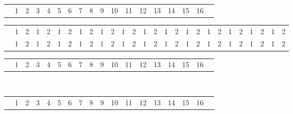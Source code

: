 \documentclass[22pt]{scrartcl}
\begin{document}
\begin{table}
\begin{tabular}{p{5cm}|c|c|c|c|c|c!{\vrule width 2pt}c|c|c|c|c|c|c|c|c|c!{\vrule width 3pt}p{1cm}!{\vrule width 3pt}}
 & 1 & 2 & 3 & 4 & 5 & 6 & 7 & 8 & 9 & 10 & 11 & 12 & 13 & 14 & 15 & 16 & \\
\end{tabular}

\begin{tabular}{p{5cm}|c|c|c|c|c|c|c|c|c|c|c|c|c|c|c|c|c|c|c|c|c|c|c|c|c|c|}

\cline{2-27}
 & \footnotesize 1 & \footnotesize 2 & \footnotesize 1 & \footnotesize 2 & \footnotesize 1 & \footnotesize 2 & \footnotesize 1 & \footnotesize 2 & \footnotesize 1 & \footnotesize 2 & \footnotesize 1 & \footnotesize 2 & \footnotesize 1 & \footnotesize 2 & \footnotesize 1 & \footnotesize 2 & \footnotesize 1 & \footnotesize 2 & \footnotesize 1 & \footnotesize 2 & \footnotesize 1 & \footnotesize 2 & \footnotesize 1 & \footnotesize 2 & \footnotesize 1 & \footnotesize 2 \\
\cline{1-27} 

\cline{1-27}
 & \footnotesize 1 & \footnotesize 2 & \footnotesize 1 & \footnotesize 2 & \footnotesize 1 & \footnotesize 2 & \footnotesize 1 & \footnotesize 2 & \footnotesize 1 & \footnotesize 2 & \footnotesize 1 & \footnotesize 2 & \footnotesize 1 & \footnotesize 2 & \footnotesize 1 & \footnotesize 2 & \footnotesize 1 & \footnotesize 2 & \footnotesize 1 & \footnotesize 2 & \footnotesize 1 & \footnotesize 2 & \footnotesize 1 & \footnotesize 2 & \footnotesize 1 & \footnotesize 2 \\
\cline{2-27}

\end{tabular}

\begin{tabular}{p{5cm}|c|c|c|c|c|c!{\vrule width 2pt}c|c|c|c|c|c|c|c|c|c!{\vrule width 3pt}p{1cm}!{\vrule width 3pt}}

& 1 & 2 & 3 & 4 & 5 & 6 & 7 & 8 & 9 & 10 & 11 & 12 & 13 & 14 & 15 & 16 & \\
\end{tabular}

~\\

\begin{tabular}{p{5cm}|c|c|c|c|c|c!{\vrule width 2pt}c|c|c|c|c|c|c|c|c|c!{\vrule width 3pt}p{1cm}!{\vrule width 3pt}}
 & 1 & 2 & 3 & 4 & 5 & 6 & 7 & 8 & 9 & 10 & 11 & 12 & 13 & 14 & 15 & 16 & \\
\end{tabular}


\end{table}
\end{document}
